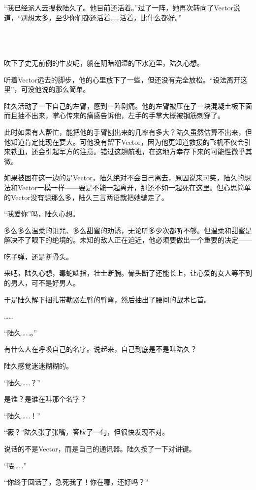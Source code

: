 “我已经派人去搜救陆久了。他目前还活着。”过了一阵，她再次转向了Vector说道，“别想太多，至少你们都还活着……活着，比什么都好。”



 \section*{}

吹下了史无前例的牛皮呢，躺在阴暗潮湿的下水道里，陆久心想。

听着Vector远去的脚步，他的心里放下了一些，但还没有完全放松。“设法离开这里”，可没他说的那么简单。

陆久活动了一下自己的左臂，感到一阵剧痛。他的左臂被压在了一块混凝土板下面而且抽不出来，掌心传来的痛感告诉他，左手的手掌大概被钢筋刺穿了。

此时如果有人帮忙，能把他的手臂刨出来的几率有多大？陆久虽然估算不出来，但他知道肯定比现在要大。可他没有留下Vector，因为他更知道救援的飞机不仅会引来铁血，还会引起军方的注意。错过这趟航班，在这地方幸存下来的可能性微乎其微。

如果被困在这一边的是Vector，陆久绝对不会自己离去，原因说来可笑，陆久的想法和Vector一模一样——要是不能一起离开，那还不如一起死在这里。但心思简单的Vector没有想那么多，陆久三言两语就把她骗走了。

“我爱你”吗，陆久心想。

多么多么温柔的诅咒、多么甜蜜的劝诱，无论听多少次都听不够。但温柔和甜蜜是解决不了眼下的绝境的。未知的敌人正在迫近，他必须要做出一个重要的决定——

吃子弹，还是断骨头。

来吧，陆久心想，毒蛇啮指，壮士断腕。骨头断了还能长上，让心爱的女人等不到的男人，可不是好男人。

于是陆久解下捆扎带勒紧左臂的臂弯，然后抽出了腰间的战术匕首。

……

“陆久……。”

有什么人在呼唤自己的名字。说起来，自己到底是不是叫陆久？

陆久感觉迷迷糊糊的。

“陆久……？”

是谁？是谁在叫那个名字？

“陆久……！”

“薇？”陆久张了张嘴，答应了一句，但很快发现不对。

说话的不是Vector，而是自己的通讯器。陆久按了一下对讲键。

“喂……”

“你终于回话了，急死我了！你在哪，还好吗？”

